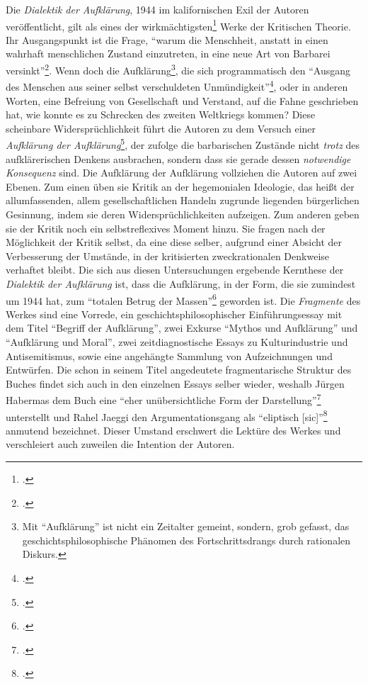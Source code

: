 \documentclass[a4paper, 12pt]{article}
\begin{document}
\begin{onehalfspace}
\noindent Die \emph{Dialektik der Aufklärung}, 1944 im kalifornischen Exil der Autoren veröffentlicht, gilt als eines der wirkmächtigsten\footnote{\Cite[Vgl.][S. 249]{jaeggi}.} Werke der Kritischen Theorie. Ihr Ausgangspunkt ist die Frage, "`warum die Menschheit, anstatt in einen wahrhaft menschlichen Zustand einzutreten, in eine neue Art von Barbarei versinkt"'\footnote{\Cite[Siehe][S. 1]{dialektik-der-aufklaerung}.}. Wenn doch die Aufklärung\footnote{Mit "`Aufklärung"' ist nicht ein Zeitalter gemeint, sondern, grob gefasst, das geschichtsphilosophische Phänomen des Fortschrittsdrangs durch rationalen Diskurs.}, die sich programmatisch den "`Ausgang des Menschen aus seiner selbst verschuldeten Unmündigkeit"'\footnote{\Cite[Siehe][S. 481]{kant}.}, oder in anderen Worten, eine Befreiung von Gesellschaft und Verstand, auf die Fahne geschrieben hat, wie konnte es zu Schrecken des zweiten Weltkriegs kommen? Diese scheinbare Widersprüchlichkeit führt die Autoren zu dem Versuch einer \emph{Aufklärung der Aufklärung}\footnote{\Cite[Vgl.][S. 406]{habermas}.}, der zufolge die barbarischen Zustände nicht \emph{trotz} des aufklärerischen Denkens ausbrachen, sondern dass sie gerade dessen \emph{notwendige Konsequenz} sind. Die Aufklärung der Aufklärung vollziehen die Autoren auf zwei Ebenen. Zum einen üben sie Kritik an der hegemonialen Ideologie, das heißt der allumfassenden, allem gesellschaftlichen Handeln zugrunde liegenden bürgerlichen Gesinnung, indem sie deren Widersprüchlichkeiten aufzeigen. Zum anderen geben sie der Kritik noch ein selbstreflexives Moment hinzu. Sie fragen nach der Möglichkeit der Kritik selbst, da eine diese selber, aufgrund einer Absicht der Verbesserung der Umstände, in der kritisierten zweckrationalen Denkweise verhaftet bleibt. Die sich aus diesen Untersuchungen ergebende Kernthese der \emph{Dialektik der Aufklärung} ist, dass die Aufklärung, in der Form, die sie zumindest um 1944 hat, zum "`totalen Betrug der Massen"'\footnote{\Cite[Siehe][S. 49]{dialektik-der-aufklaerung}.} geworden ist. Die \emph{Fragmente} des Werkes sind eine Vorrede, ein geschichtsphilosophischer Einführungsessay mit dem Titel "`Begriff der Aufklärung"', zwei Exkurse "`Mythos und Aufklärung"' und "`Aufklärung und Moral"', zwei zeitdiagnostische Essays zu Kulturindustrie und Antisemitismus, sowie eine angehängte Sammlung von Aufzeichnungen und Entwürfen. Die schon in seinem Titel angedeutete fragmentarische Struktur des Buches findet sich auch in den einzelnen Essays selber wieder, weshalb Jürgen Habermas dem Buch eine "`eher unübersichtliche Form der Darstellung"'\footnote{\Cite[Siehe][S. 406]{habermas}.} unterstellt und Rahel Jaeggi den Argumentationsgang als "`eliptisch [sic]"'\footnote{\Cite[Siehe][S. 250]{jaeggi}.} anmutend bezeichnet. Dieser Umstand erschwert die Lektüre des Werkes und verschleiert auch zuweilen die Intention der Autoren.


\end{onehalfspace}
\end{document}
